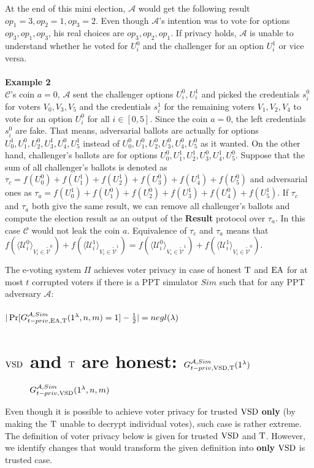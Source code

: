 At the end of this mini election,  $\mathcal{A}$ would get the following result $op_1 = 3, op_2 = 1, op_3 = 2$. Even though  $\mathcal{A}$'s intention was  to vote for options $op_3,op_1,op_3$, his real choices are $op_3,op_2,op_1$. If privacy holds, $\mathcal{A}$  is unable to understand whether he voted for $U_i^0$ and the challenger for an option $U_i^1$ or vice versa. \\\\
\textbf{Example 2}\\
$\mathcal{C}$'s coin $a=0$, $\mathcal{A}$ sent the challenger options $U_i^0,U_i^1$ and picked the credentials $s_i^0$ for voters $V_0,V_3,V_5$ and the credentials $s_i^1$ for the remaining voters $V_1,V_2,V_4$ to vote for an option $U_i^0$ for all $i \in [0,5]$. Since the coin $a=0$, the left credentials $s_i^0$ are fake. That means, adversarial ballots are actually for options $U_0^1,U_1^0,U_2^0,U_3^1,U_4^0,U_5^1$ instead of $U_0^0,U_1^0,U_2^0,U_3^0,U_4^0,U_5^0$ as it wanted. On the other hand, challenger's ballots are for options $U_0^0,U_1^1,U_2^1,U_3^0,U_4^1,U_5^0$. Suppose that  the sum of all challenger's ballots is denoted as $\tau_c = f(U_0^0) + f(U_1^1) + f(U_2^1) + f(U_3^0) + f(U_4^1) + f(U_5^0)$ and adversarial ones as $\tau_a =  f(U_0^1) + f(U_1^0) + f(U_2^0) + f(U_3^1) + f(U_4^0) + f(U_5^1)$. If $\tau_c$ and $\tau_a$ both give the same result, we can remove all challenger's ballots and compute the election result as  an output of the \textbf{Result} protocol over $\tau_a$. In this case $\mathcal{C}$ would not leak the coin $a$. Equivalence of $\tau_c$ and $\tau_a$ means that $f(\langle \mathcal{U}^0_i \rangle _{V_i \in \tilde{\mathcal{V}}^0} ) + f(\langle \mathcal{U}^1_i \rangle _{V_i \in \tilde{\mathcal{V}}^1} ) =  f(\langle \mathcal{U}^0_i \rangle _{V_i \in \tilde{\mathcal{V}}^1} ) +  f(\langle \mathcal{U}^1_i \rangle _{V_i \in \tilde{\mathcal{V}}^0} )$.
\begin{definition}
The e-voting system $\Pi$ achieves voter privacy in case of honest $\operatorname{T}$ and $\operatorname{EA}$  for at most $t$ corrupted voters if there is a PPT simulator $Sim$ such that for any PPT adversary $\mathcal{A}$:\\\\
 $|\Pr[G_{t-priv,\operatorname{EA},\operatorname{T}}^{\mathcal{A}, Sim}(1^{\lambda},n,m) = 1] - \frac{1}{2}| = negl(\lambda)$
 \end{definition}
\section{$\operatorname{VSD}$ and $\operatorname{T}$ are honest: $G_{t-priv,\operatorname{VSD},\operatorname{T}}^{\mathcal{A},Sim}(1^{\lambda})$}
     \begin{figure}[h!]
 
        \caption{ $G_{t-priv,\operatorname{VSD}}^{\mathcal{A},Sim}(1^{\lambda},n,m)$}
\end{figure}
Even though it is possible to achieve voter privacy for trusted $\operatorname{VSD}$ \textbf{only}  (by making the $\operatorname{T}$ unable to decrypt individual votes), such case is rather extreme. The definition of voter privacy below is given for trusted $\operatorname{VSD}$ and $\operatorname{T}$. However, we identify changes that would transform the given definition into \textbf{only} $\operatorname{VSD}$ is trusted case.\\

